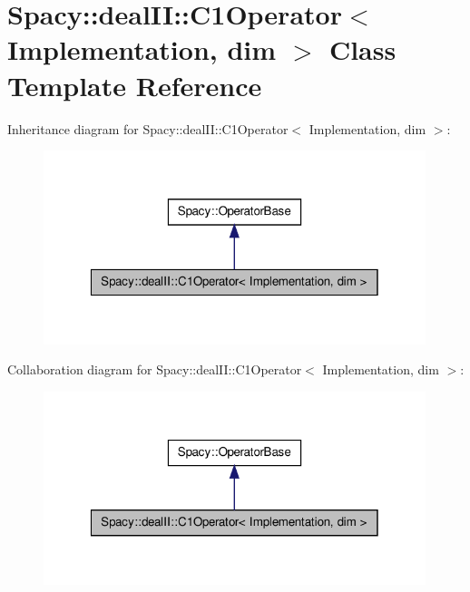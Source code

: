 \hypertarget{classSpacy_1_1dealII_1_1C1Operator}{\section{\-Spacy\-:\-:deal\-I\-I\-:\-:\-C1\-Operator$<$ \-Implementation, dim $>$ \-Class \-Template \-Reference}
\label{classSpacy_1_1dealII_1_1C1Operator}
}


\-Inheritance diagram for \-Spacy\-:\-:deal\-I\-I\-:\-:\-C1\-Operator$<$ \-Implementation, dim $>$\-:
\nopagebreak
\begin{figure}[H]
\begin{center}
\leavevmode
\includegraphics[width=316pt]{classSpacy_1_1dealII_1_1C1Operator__inherit__graph}
\end{center}
\end{figure}


\-Collaboration diagram for \-Spacy\-:\-:deal\-I\-I\-:\-:\-C1\-Operator$<$ \-Implementation, dim $>$\-:
\nopagebreak
\begin{figure}[H]
\begin{center}
\leavevmode
\includegraphics[width=316pt]{classSpacy_1_1dealII_1_1C1Operator__coll__graph}
\end{center}
\end{figure}
